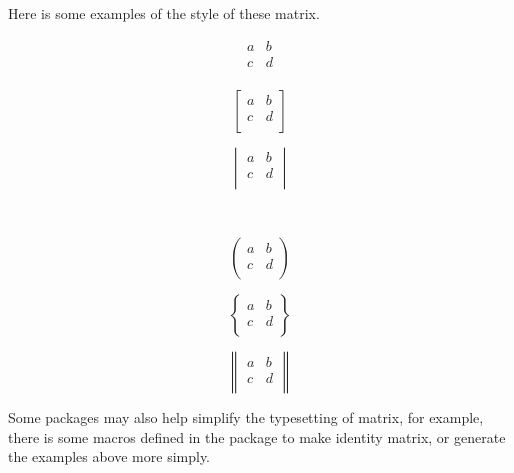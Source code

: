 \begin{frame}
	Here is some examples of the style of these matrix.
	\begin{example}
		\begin{minipage}{0.3\linewidth}
			\centering {}
			$$\begin{matrix}a&b\\c&d\\\end{matrix}$$
		\end{minipage}
		\hfill
		\begin{minipage}{0.3\linewidth}
			\centering {}
			$$\begin{bmatrix}a&b\\c&d\\\end{bmatrix}$$
		\end{minipage}
		\hfill
		\begin{minipage}{0.3\linewidth}
			\centering {}
			$$\begin{vmatrix}a&b\\c&d\\\end{vmatrix}$$
		\end{minipage}
		\vfill
		\ \\[1em]
		\begin{minipage}{0.3\linewidth}
			\centering {}
			$$\begin{pmatrix}a&b\\c&d\\\end{pmatrix}$$
		\end{minipage}
		\hfill
		\begin{minipage}{0.3\linewidth}
			\centering {}
			$$\begin{Bmatrix}a&b\\c&d\\\end{Bmatrix}$$
		\end{minipage}
		\hfill
		\begin{minipage}{0.3\linewidth}
			\centering {}
			$$\begin{Vmatrix}a&b\\c&d\\\end{Vmatrix}$$
		\end{minipage}
	\end{example}
	
Some packages may also help simplify the typesetting of matrix, for example, there is some macros defined in the  package to make identity matrix, or generate the examples above more simply. 
	
\end{frame}

